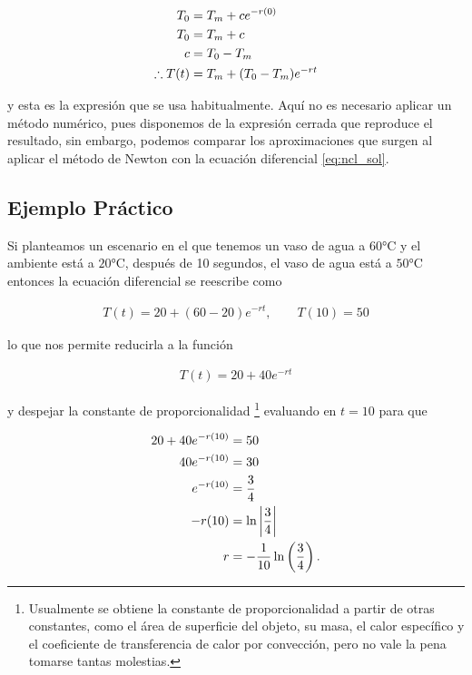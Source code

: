 \documentclass[letter]{tufte-handout} %
\begin{document}
\begin{align}
	T_0             & = T_m + ce^{-r(0)} \notag                     \\
	T_0             & = T_m + c  \notag                             \\
	c               & = T_0 - T_m  \notag                           \\
	\therefore T(t) & = T_m + (T_0 - T_m)e^{-rt} \label{eq:ncl_sol}
\end{align}

y esta es la expresión que se usa habitualmente. Aquí no es necesario aplicar un método numérico,
pues disponemos de la expresión cerrada que reproduce el resultado, sin embargo, podemos comparar
los aproximaciones que surgen al aplicar el método de Newton con la ecuación
diferencial \eqref{eq:ncl_sol}.



\subsection{Ejemplo Práctico}
Si planteamos un escenario en el que tenemos un vaso de agua a $60\text{°C}$ y el ambiente está a $20\text{°C}$,
después de 10 segundos, el vaso de agua está a $50\text{°C}$ entonces la ecuación diferencial se reescribe como

\begin{align*}
	T(t) = 20 + (60 - 20)e^{-rt}, \qquad T(10) = 50
\end{align*}

lo que nos permite reducirla a la función

\begin{align*}
	T(t) = 20 + 40e^{-rt}
\end{align*}

y despejar la constante de proporcionalidad
\footnote{Usualmente se obtiene la constante de proporcionalidad a partir de otras constantes, como
	el área de superficie del objeto, su masa, el calor específico y el coeficiente de transferencia de
	calor por convección, pero no vale la pena tomarse tantas molestias.}
evaluando en $t=10$ para que


\begin{align}
	20 + 40e^{-r(10)} & = 50 \notag                                                           \\
	40e^{-r(10)}      & = 30 \notag                                                           \\
	e^{-r(10)}        & = \frac{3}{4} \notag                                                  \\
	-r(10)            & = \ln\left|\frac{3}{4}\right| \notag                                  \\
	r                 & = -\frac{1}{10}\ln\left(\frac{3}{4}\right)\text{.} \label{eq:r_value}
\end{align}
\end{document}
